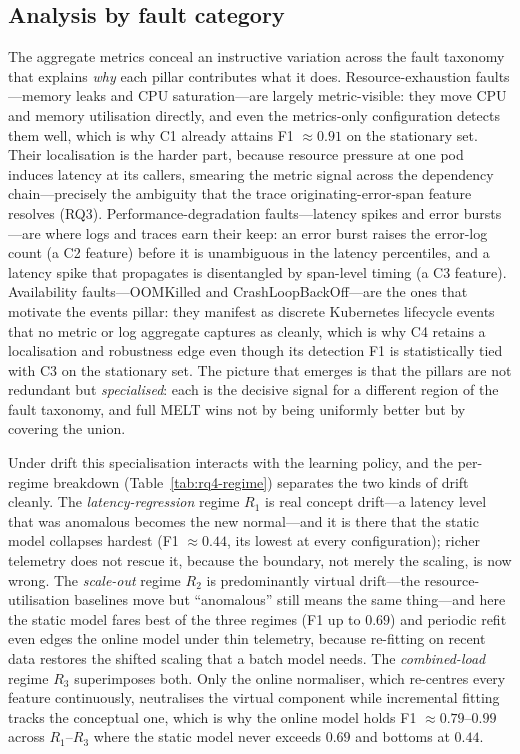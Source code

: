 \documentclass[acmsmall]{acmart}
\begin{document}
\subsection{Analysis by fault category}\label{sec:disc-faults}

The aggregate metrics conceal an instructive variation across the fault taxonomy that explains \emph{why} each pillar contributes what it does. Resource-exhaustion faults---memory leaks and CPU saturation---are largely metric-visible: they move CPU and memory utilisation directly, and even the metrics-only configuration detects them well, which is why C1 already attains F1 $\approx 0.91$ on the stationary set. Their localisation is the harder part, because resource pressure at one pod induces latency at its callers, smearing the metric signal across the dependency chain---precisely the ambiguity that the trace originating-error-span feature resolves (RQ3). Performance-degradation faults---latency spikes and error bursts---are where logs and traces earn their keep: an error burst raises the error-log count (a C2 feature) before it is unambiguous in the latency percentiles, and a latency spike that propagates is disentangled by span-level timing (a C3 feature). Availability faults---OOMKilled and CrashLoopBackOff---are the ones that motivate the events pillar: they manifest as discrete Kubernetes lifecycle events that no metric or log aggregate captures as cleanly, which is why C4 retains a localisation and robustness edge even though its detection F1 is statistically tied with C3 on the stationary set. The picture that emerges is that the pillars are not redundant but \emph{specialised}: each is the decisive signal for a different region of the fault taxonomy, and full MELT wins not by being uniformly better but by covering the union.

Under drift this specialisation interacts with the learning policy, and the per-regime breakdown (Table~\ref{tab:rq4-regime}) separates the two kinds of drift cleanly. The \emph{latency-regression} regime $R_1$ is real concept drift---a latency level that was anomalous becomes the new normal---and it is there that the static model collapses hardest (F1 $\approx 0.44$, its lowest at every configuration); richer telemetry does not rescue it, because the boundary, not merely the scaling, is now wrong. The \emph{scale-out} regime $R_2$ is predominantly virtual drift---the resource-utilisation baselines move but ``anomalous'' still means the same thing---and here the static model fares best of the three regimes (F1 up to $0.69$) and periodic refit even edges the online model under thin telemetry, because re-fitting on recent data restores the shifted scaling that a batch model needs. The \emph{combined-load} regime $R_3$ superimposes both. Only the online normaliser, which re-centres every feature continuously, neutralises the virtual component while incremental fitting tracks the conceptual one, which is why the online model holds F1 $\approx 0.79$--$0.99$ across $R_1$--$R_3$ where the static model never exceeds $0.69$ and bottoms at $0.44$.
\end{document}
